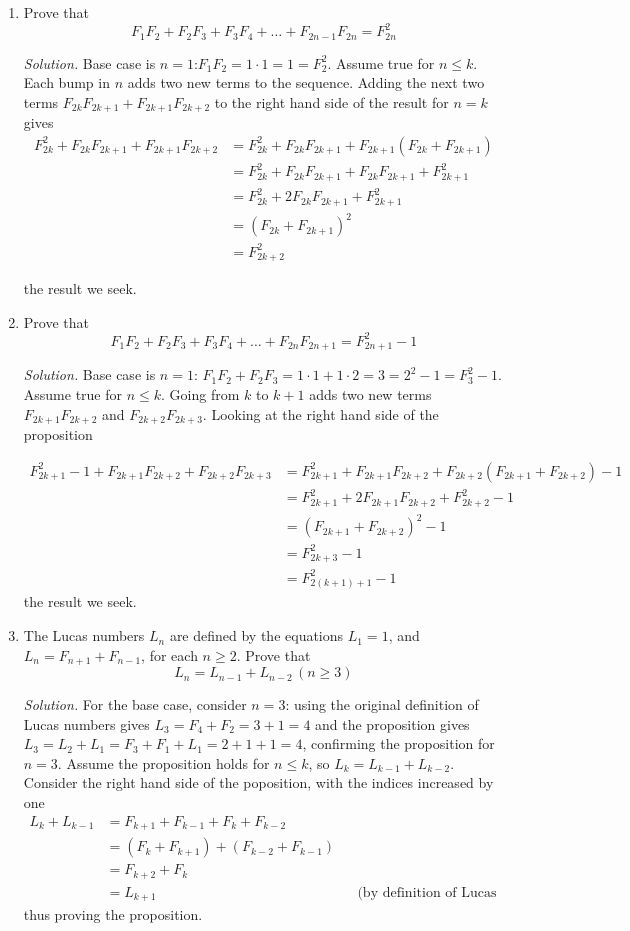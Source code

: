 \documentclass[12pt]{article}
\newcommand\sol[1]{\begin{mdframed}
\emph{Solution.} #1
\end{mdframed}}
\begin{document}
\begin{enumerate}
  \item Prove that
    \[
    F_1F_2 + F_2F_3 + F_3F_4 + \ldots + F_{2n-1}F_{2n} = F^2_{2n}
    \]
    \sol{ Base case is $n=1$:$F_1F_2 = 1\cdot1 = 1 = F_2^2$. Assume
      true for $n \le k$. Each bump in $n$ adds two new terms to the
      sequence. Adding the next two terms $F_{2k}F_{2k+1} +
      F_{2k+1}F_{2k+2}$ to the right hand side of the result for $n=k$
      gives
      \begin{align*}
        F^2_{2k} +F_{2k}F_{2k+1} + F_{2k+1}F_{2k+2} &= F^2_{2k} +F_{2k}F_{2k+1} + F_{2k+1}( F_{2k} + F_{2k+1}) \\
                &= F^2_{2k} + F_{2k}F_{2k+1} + F_{2k}F_{2k+1} + F_{2k+1}^2 \\
                &= F^2_{2k} + 2F_{2k}F_{2k+1} + F_{2k+1}^2 \\
        &= (F_{2k} + F_{2k+1})^2 \\
        &= F_{2k+2}^2
      \end{align*}
    }
    the result we seek.
    
  \item Prove that
    \[
    F_1F_2 + F_2F_3 + F_3F_4 + \ldots + F_{2n}F_{2n+1} = F^2_{2n+1}-1
    \]
    \sol{ Base case is $n=1$: $F_1F_2 + F_2F_3= 1\cdot1 + 1\cdot2 = 3 = 2^2 - 1 = F_3^2-1$. Assume true for $n \le k$.  Going from $k$ to $k+1$ adds two new terms $F_{2k+1}F_{2k+2}$ and $F_{2k+2}F_{2k+3}$. Looking at the right hand side of the proposition}
    \begin{align*}
      F^2_{2k+1} - 1 + F_{2k+1}F_{2k+2} + F_{2k+2}F_{2k+3} &= F^2_{2k+1} + F_{2k+1}F_{2k+2} + F_{2k+2}(F_{2k+1} + F_{2k+2}) - 1\\
      &= F^2_{2k+1} + 2F_{2k+1}F_{2k+2} +  F_{2k+2}^2 - 1\\
      &= (F_{2k+1} + F_{2k+2})^2 - 1\\
      &= F^2_{2k+3} - 1 \\
      &= F^2_{2(k+1)+1} - 1
    \end{align*}
    the result we seek.

  \item \label{ex13} The Lucas numbers $L_n$ are defined by the equations $L_1=1$, and $L_n = F_{n+1} + F_{n-1}$, for each $n \ge 2$. Prove that
    \[
    L_n = L_{n-1} + L_{n-2} \, (n \ge 3) 
    \]
    \sol{
      For the base case, consider $n=3$: using the original definition of Lucas numbers gives $L_3 = F_4 + F_2 = 3 + 1 = 4$ and the proposition gives $L_3 = L_2 + L_1 = F_3 + F_1 + L_1 = 2 + 1+1 =4$, confirming the proposition for $n=3$. Assume the proposition holds for $n \le k$, so $L_k =L_{k-1} + L_{k-2}$. Consider the right hand side of the poposition, with the indices increased by one
      \begin{align*}
        L_{k} + L_{k-1} &= F_{k+1} + F_{k-1} + F_{k} + F_{k-2} \\
        &= (F_{k} + F_{k+1}) + (F_{k-2} + F_{k-1}) \\
        &= F_{k+2} + F_k \\
        &= L_{k+1} && \text{(by definition of Lucas numbers)}
      \end{align*}
      thus proving the proposition.
      }


\end{enumerate}
\end{document}
